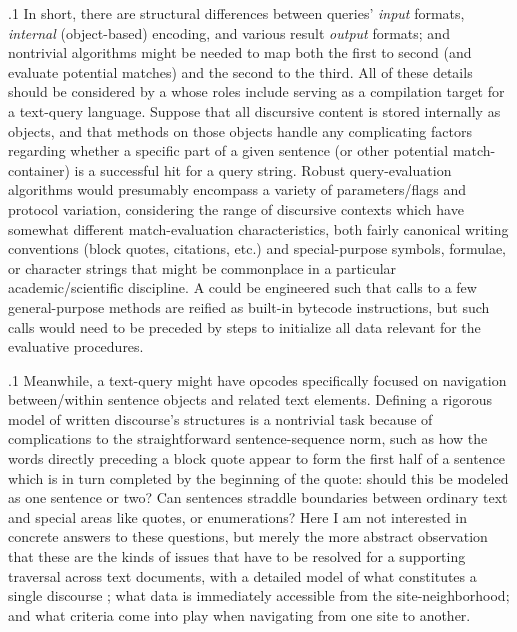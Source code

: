 \documentclass[11pt, twocolumn]{article}
\begin{document}
\p.1{%
In short, there are structural differences between queries' \textit{input}
formats, \textit{internal} (object-based) encoding, and various result
\textit{output} formats; and nontrivial algorithms might be
needed to map both the first to second (and evaluate potential
matches) and the second to the third. All of these details
should be considered by a  whose roles include serving as a
compilation target for a text-query language. Suppose
that all discursive content is stored internally as
 objects, and that methods on those objects
handle any complicating factors regarding whether a
specific part of a given sentence (or other potential match-container) is a successful
hit for a query string. Robust query-evaluation algorithms
would presumably encompass a variety of parameters/flags and
protocol variation, considering the range of discursive
contexts which have somewhat different match-evaluation
characteristics, both \visavis{} fairly canonical
writing conventions (block quotes, citations, etc.) and
special-purpose symbols, formulae, or character strings that
might be commonplace in a particular academic/scientific discipline.
A  could be engineered such that calls to a few general-purpose
 methods are reified as built-in bytecode instructions,
but such calls would need to be preceded by steps
to initialize all data relevant for the  evaluative procedures.
}%

\p.1{%
Meanwhile, a text-query  might have opcodes specifically
focused on navigation between/within sentence objects and
related text elements. Defining a rigorous 
model of written discourse's structures is a nontrivial
task because of complications to the straightforward
sentence-sequence norm, such as how the words directly
preceding a block quote appear to form the first half of a
sentence which is in turn completed by the beginning of
the quote: should this be modeled as one sentence or two?
Can sentences straddle boundaries between ordinary text
and special areas like quotes, or enumerations? Here
I am not interested in concrete answers to these questions,
but merely the more abstract observation that these are
the kinds of issues that have to be resolved
for a  supporting traversal
across text documents, with a detailed model of
what constitutes a single discourse ;
what data is immediately accessible from the site-neighborhood;
and what criteria come into play when navigating
from one site to another.
}%
\end{document}
